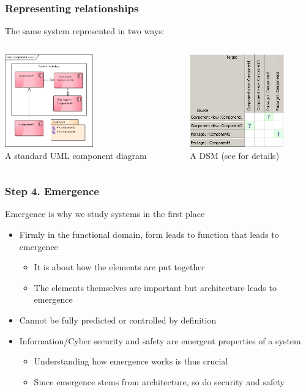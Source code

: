 \documentclass[10pt, compress]{beamer}
\begin{document}
\begin{frame}
	\frametitle{Representing relationships}
	\begin{center}
	The same system represented in two ways:\\[4mm]
	\begin{columns}[T]
		\begin{column}{4cm}
			\includegraphics[height=4cm]{component.png}\\
			A standard UML component diagram
		\end{column}
		\begin{column}[T]{4cm}
			\includegraphics[height=4cm]{matrix.png}\\
			A DSM (see \cite{browning2001applying} for details)
		\end{column}
	\end{columns}
	\end{center}
\end{frame}

\begin{frame}
	\frametitle{Step 4. Emergence}
	Emergence is why we study systems in the first place
	\begin{itemize}
		\item Firmly in the functional domain, form leads to function that leads to emergence
		\begin{itemize}
			\item It is about how the elements are put together
			\item The elements themselves are important but architecture leads to emergence 
		\end{itemize}
		\item Cannot be fully predicted or controlled by definition
		\item Information/Cyber security and safety are emergent properties of a system
		\begin{itemize}
			\item Understanding how emergence works is thus crucial
			\item Since emergence stems from architecture, so do security and safety
		\end{itemize}
	\end{itemize}
\end{frame}
\end{document}
